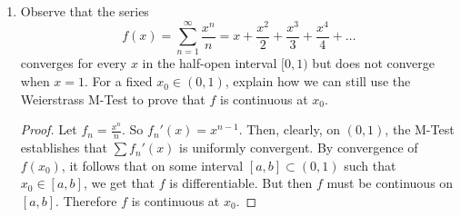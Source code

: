 \begin{enumerate}
    \begin{proof}
    \begin{enumerate}
        \item Let
        \[
        f_n(x) = \sum_{k=1}^\infty \frac{\sin(kx)}{k^3}
        \]
        Then, we see that if \( [a,b] \) is an interval containing zero, then there is a point in \( a,b \) for which \( \sum f_n \) is convergent. In particular if \( x = 0 \) we have
        \[
        \sum_{k=1}^\infty f_n(0) \rightarrow 0
        \]
        Furthermore,
        \[
        f_n'(x) = \frac{\cos(kx)}{k^2}
        \]
        Now, since
        \[
        \vert f_n'(x) \vert \leq \frac{1}{k^2} = M_k
        \]
        it follows by the convergence of \( \sum \frac{1}{k^2} \) and by the M-Test that \( \sum f_n'(x) \) is uniformly convergent on \( \mathbb{R} \). Then, by Theorem 6.4.3, it follows \( \sum \frac{\sin(kx)}{k^3} \rightarrow f(x) \) uniformly on \( \mathbb{R} \) and that \( f(x) \) is differentiable on \( \mathbb{R} \). Furthermore,
        \[
        f'(x) = \sum_{k=1}^\infty \frac{\cos(kx)}{k^2}
        \]
        By uniform convergence of \( \sum \frac{cos(kx)}{k^2} \) on \( \mathbb{R} \) and continuity of \( \frac{\cos(kx)}{k^2} \), it follows by Theorem 6.4.2 that \( f'(x) \) is continuous on \( \mathbb{R} \). 
        
        \item Not by the methods outlined in this section. We see that
        \[
        \vert f_n''(x) \vert \leq \frac{1}{k} = M_k
        \]
        but \( \sum M_k \) does not converge. Thus, we cannot use the M-Test, as in the above, to establish uniform convergence of \( \sum f_n''(x) \).
    \end{enumerate}
    \end{proof}
    
    \item Observe that the series
    \[
    f(x) = \sum_{n=1}^{\infty} \frac{x^n}{n} = x + \frac{x^2}{2} + \frac{x^3}{3} + \frac{x^4}{4} + \ldots
    \]
    converges for every \( x \) in the half-open interval \( [0,1) \) but does not converge when \( x=1 \). For a fixed \( x_0 \in (0,1) \), explain how we can still use the Weierstrass M-Test to prove that \( f \) is continuous at \( x_0 \). 
    
    \begin{proof}
    Let \( f_n = \frac{x^n}{n} \). So \( f_n'(x) = x^{n-1} \). Then, clearly, on \( (0,1) \), the M-Test establishes that \( \sum f_n'(x) \) is uniformly convergent. By convergence of \( f(x_0) \), it follows that on some interval \( [a,b] \subset (0,1) \) such that \( x_0 \in [a,b] \), we get that \( f \) is differentiable. But then \( f \) must be continuous on \( [a,b] \). Therefore \( f \) is continuous at \( x_0 \).
    \end{proof}
    

\end{enumerate}
